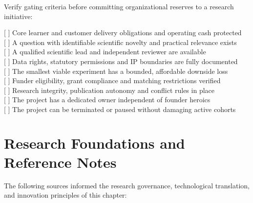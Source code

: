 Verify gating criteria before committing organizational reserves to a research initiative:

\begin{tcolorbox}[colback=BayesCanvas,colframe=BayesDark,arc=1mm,title=\textbf{Appendix K: Bayes Research Entry Gate Checklist}]
\scriptsize\ttfamily
{[ ]} Core learner and customer delivery obligations and operating cash protected\\
{[ ]} A question with identifiable scientific novelty and practical relevance exists\\
{[ ]} A qualified scientific lead and independent reviewer are available\\
{[ ]} Data rights, statutory permissions and IP boundaries are fully documented\\
{[ ]} The smallest viable experiment has a bounded, affordable downside loss\\
{[ ]} Funder eligibility, grant compliance and matching restrictions verified\\
{[ ]} Research integrity, publication autonomy and conflict rules in place\\
{[ ]} The project has a dedicated owner independent of founder heroics\\
{[ ]} The project can be terminated or paused without damaging active cohorts
\end{tcolorbox}

\section{Research Foundations and Reference Notes}

The following sources informed the research governance, technological translation, and innovation principles of this chapter:

